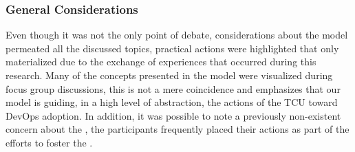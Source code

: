 \subsubsection{General Considerations}

{
\color{blue}
Even though it was not the only point of debate, considerations about the model
permeated all the discussed topics, practical actions were highlighted that only
materialized due to the exchange of experiences that occurred during this
research. Many of the concepts presented in the model were visualized during
focus group discussions, this is not a mere coincidence and emphasizes that our
model is guiding, in a high level of abstraction, the actions of the TCU toward
DevOps adoption. In addition, it was possible to note a previously non-existent
concern about the \cc, the participants frequently placed their actions as part
of the efforts to foster the \cc.
}

